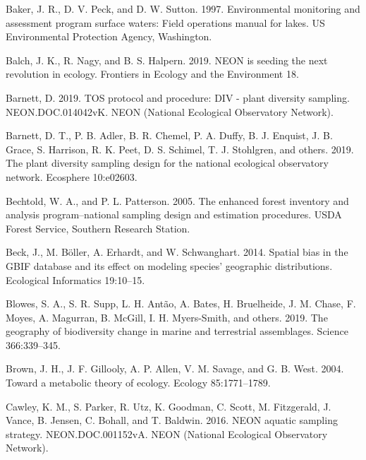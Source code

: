\documentclass[
  12pt,
]{article}
\newlength{\cslhangindent}
\newlength{\cslentryspacingunit} %
\newenvironment{CSLReferences}[2] %
 {%
  \setlength{\parindent}{0pt}
  \ifodd #1
  \let\oldpar\par
  \def\par{\hangindent=\cslhangindent\oldpar}
  \fi
  \setlength{\parskip}{#2\cslentryspacingunit}
 }%
 {}
\begin{document}
\hypertarget{refs}{}
\begin{CSLReferences}{1}{0}
\leavevmode{}%
Baker, J. R., D. V. Peck, and D. W. Sutton. 1997. Environmental monitoring and assessment program surface waters: Field operations manual for lakes. US Environmental Protection Agency, Washington.

\leavevmode{}%
Balch, J. K., R. Nagy, and B. S. Halpern. 2019. NEON is seeding the next revolution in ecology. Frontiers in Ecology and the Environment 18.

\leavevmode{}%
Barnett, D. 2019. TOS protocol and procedure: DIV - plant diversity sampling. NEON.DOC.014042vK. NEON (National Ecological Observatory Network).

\leavevmode{}%
Barnett, D. T., P. B. Adler, B. R. Chemel, P. A. Duffy, B. J. Enquist, J. B. Grace, S. Harrison, R. K. Peet, D. S. Schimel, T. J. Stohlgren, and others. 2019. The plant diversity sampling design for the national ecological observatory network. Ecosphere 10:e02603.

\leavevmode{}%
Bechtold, W. A., and P. L. Patterson. 2005. The enhanced forest inventory and analysis program--national sampling design and estimation procedures. USDA Forest Service, Southern Research Station.

\leavevmode{}%
Beck, J., M. Böller, A. Erhardt, and W. Schwanghart. 2014. Spatial bias in the GBIF database and its effect on modeling species' geographic distributions. Ecological Informatics 19:10--15.

\leavevmode{}%
Blowes, S. A., S. R. Supp, L. H. Antão, A. Bates, H. Bruelheide, J. M. Chase, F. Moyes, A. Magurran, B. McGill, I. H. Myers-Smith, and others. 2019. The geography of biodiversity change in marine and terrestrial assemblages. Science 366:339--345.

\leavevmode{}%
Brown, J. H., J. F. Gillooly, A. P. Allen, V. M. Savage, and G. B. West. 2004. Toward a metabolic theory of ecology. Ecology 85:1771--1789.

\leavevmode{}%
Cawley, K. M., S. Parker, R. Utz, K. Goodman, C. Scott, M. Fitzgerald, J. Vance, B. Jensen, C. Bohall, and T. Baldwin. 2016. NEON aquatic sampling strategy. NEON.DOC.001152vA. NEON (National Ecological Observatory Network).


\end{CSLReferences}
\end{document}
